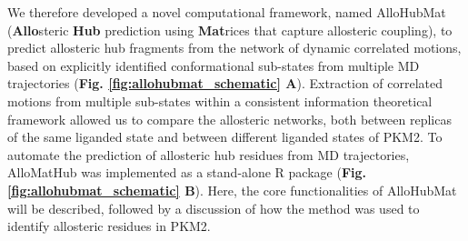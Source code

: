 We therefore developed a novel computational framework, named AlloHubMat (\textbf{Allo}steric \textbf{Hub} prediction using \textbf{Mat}rices that capture allosteric coupling), to predict allosteric hub fragments from the network of dynamic correlated motions, based on explicitly identified conformational sub-states from multiple MD trajectories (\textbf{Fig. \ref{fig:allohubmat_schematic} A}). Extraction of correlated motions from multiple sub-states within a consistent information theoretical framework allowed us to compare the allosteric networks, both between replicas of the same liganded state and between different liganded states of PKM2. To automate the prediction of allosteric hub residues from MD trajectories, AlloMatHub was implemented as a stand-alone R package (\textbf{Fig. \ref{fig:allohubmat_schematic} B}). Here, the core functionalities of AlloHubMat will be described, followed by a discussion of how the method was used to identify allosteric residues in PKM2.
%
%
%
%
